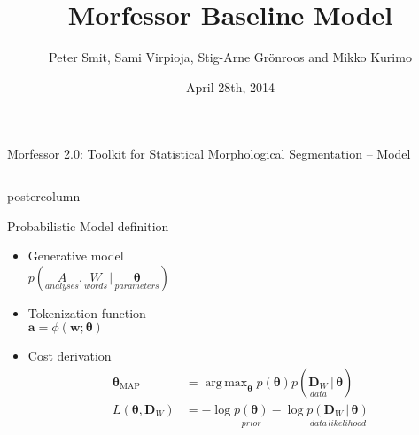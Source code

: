 \documentclass[final]{beamer} %
\title[Morfessor Model]{Morfessor Baseline Model}
\author[Smit et. al]{Peter Smit, Sami Virpioja, Stig-Arne Grönroos and Mikko Kurimo}
\institute[Aalto University]{Aalto University}
\date{April 28th, 2014}
\DeclareMathOperator*{\argmax}{arg\,max}
\newcommand{\seq}[1]{\boldsymbol{#1}}
\newcommand{\txt}[1]{\textrm{#1}}
\newcommand{\cost}{L}
\newcommand{\params}{\boldsymbol{\theta}}
\newcommand{\data}{\seq{D}}
\newcommand{\token}{\phi}
\newcommand{\vb}{\,|\,}
\begin{document}
  \begin{frame}{Morfessor 2.0: Toolkit for Statistical Morphological Segmentation -- Model} 
\begin{columns}

\begin{column}{.4\textwidth}
%            
%

      \begin{beamercolorbox}[center,wd=\textwidth]{postercolumn}
 \begin{block}{Probabilistic Model definition}
              \begin{itemize}
              \item Generative model\\
$p(\underset{analyses}{A}, \underset{words}{W} \vb \underset{parameters}{\params})$
		\item Tokenization function\\
 $\seq{a} = \token(\seq{w}; \params)$
		\item Cost derivation\\
\begin{align*}\params_{\txt{MAP}}%
&= \argmax_{\params} p(\params) p(\underset{data}{\data_W} \vb \params)\\
\cost(\params, \data_W) &= -\log \underset{prior}{p(\params)} - \log \underset{data\,likelihood}{p(\data_W \vb \params)}
\end{align*}
              \end{itemize}              
            \end{block}
            
	\end{beamercolorbox}


\end{column}
\end{columns}
\end{frame}
\end{document}
